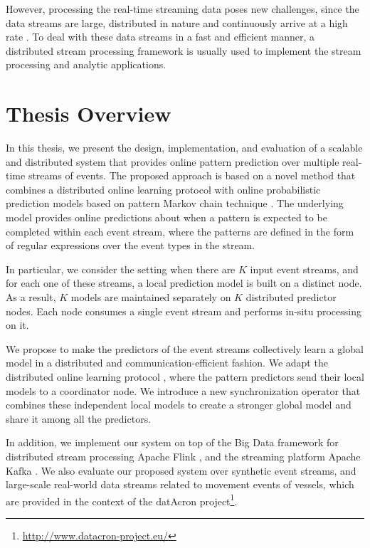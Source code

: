 \par However, processing the real-time streaming data poses new challenges, since the data streams are large, distributed in nature and continuously arrive at a high rate \cite{Babcock2002,Flouris2017}. To deal with these data streams in a fast and efficient manner, a distributed stream processing framework \cite{Spark,Flink,Storm} is usually used to implement the stream processing and analytic applications. 


\section{Thesis Overview}
\par In this thesis, we present the design, implementation, and evaluation of a scalable and distributed system that provides online pattern prediction over multiple real-time streams of events. The proposed approach is based on a novel method that combines a distributed online learning protocol \cite{kamp2014communication} with online probabilistic prediction models based on pattern Markov chain technique \cite{alevizos2017event}. The underlying model provides online predictions about when a pattern is expected to be completed within each event stream, where the patterns are defined in the form of regular expressions over the event types in the stream.

\par In particular, we consider the setting when there are \emph{$K$} input event streams, and for each one of these streams, a local prediction model is built on a distinct node. As a result, \emph{$K$} models are maintained separately on \emph{$K$} distributed predictor nodes. Each node consumes a single event stream and performs in-situ processing on it.


 \par We propose to make the predictors of the event streams collectively learn a global model in a distributed and communication-efficient fashion. We adapt the distributed online learning protocol \cite{kamp2014communication}, where the pattern predictors \cite{alevizos2017event} send their local models to a coordinator node. We introduce a new synchronization operator that combines these independent local models to create a stronger global model and share it among all the predictors.
  

\par In addition, we  implement our system on top of the Big Data framework for distributed stream processing Apache Flink \cite{Flink}, and the streaming platform Apache Kafka \cite{Kafka}. We also evaluate our proposed system over synthetic event streams, and large-scale real-world data streams related to movement events of vessels, which are provided in the context of the datAcron project\footnote{\url{http://www.datacron-project.eu/}}.

